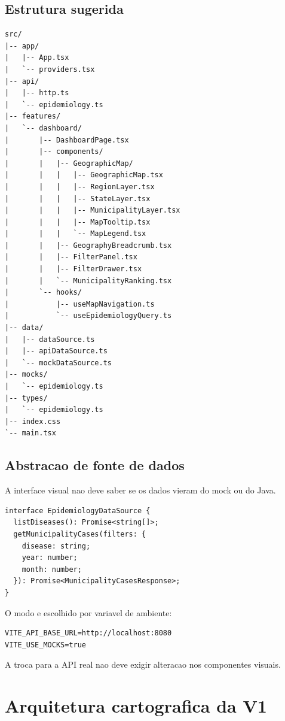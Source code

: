 \documentclass[12pt,a4paper]{article}
\begin{document}
\subsection{Estrutura sugerida}

\begin{lstlisting}
src/
|-- app/
|   |-- App.tsx
|   `-- providers.tsx
|-- api/
|   |-- http.ts
|   `-- epidemiology.ts
|-- features/
|   `-- dashboard/
|       |-- DashboardPage.tsx
|       |-- components/
|       |   |-- GeographicMap/
|       |   |   |-- GeographicMap.tsx
|       |   |   |-- RegionLayer.tsx
|       |   |   |-- StateLayer.tsx
|       |   |   |-- MunicipalityLayer.tsx
|       |   |   |-- MapTooltip.tsx
|       |   |   `-- MapLegend.tsx
|       |   |-- GeographyBreadcrumb.tsx
|       |   |-- FilterPanel.tsx
|       |   |-- FilterDrawer.tsx
|       |   `-- MunicipalityRanking.tsx
|       `-- hooks/
|           |-- useMapNavigation.ts
|           `-- useEpidemiologyQuery.ts
|-- data/
|   |-- dataSource.ts
|   |-- apiDataSource.ts
|   `-- mockDataSource.ts
|-- mocks/
|   `-- epidemiology.ts
|-- types/
|   `-- epidemiology.ts
|-- index.css
`-- main.tsx
\end{lstlisting}

\subsection{Abstracao de fonte de dados}

A interface visual nao deve saber se os dados vieram do mock ou do Java.

\begin{lstlisting}
interface EpidemiologyDataSource {
  listDiseases(): Promise<string[]>;
  getMunicipalityCases(filters: {
    disease: string;
    year: number;
    month: number;
  }): Promise<MunicipalityCasesResponse>;
}
\end{lstlisting}

O modo e escolhido por variavel de ambiente:

\begin{lstlisting}
VITE_API_BASE_URL=http://localhost:8080
VITE_USE_MOCKS=true
\end{lstlisting}

A troca para a API real nao deve exigir alteracao nos componentes visuais.

\section{Arquitetura cartografica da V1}
\end{document}
